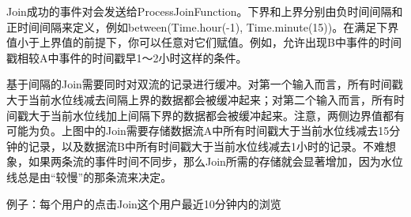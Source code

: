 \documentclass[cn,11pt,chinese]{elegantbook}
\begin{document}
Join成功的事件对会发送给ProcessJoinFunction。下界和上界分别由负时间间隔和正时间间隔来定义，例如between(Time.hour(-1), Time.minute(15))。在满足下界值小于上界值的前提下，你可以任意对它们赋值。例如，允许出现B中事件的时间戳相较A中事件的时间戳早1～2小时这样的条件。

基于间隔的Join需要同时对双流的记录进行缓冲。对第一个输入而言，所有时间戳大于当前水位线减去间隔上界的数据都会被缓冲起来；对第二个输入而言，所有时间戳大于当前水位线加上间隔下界的数据都会被缓冲起来。注意，两侧边界值都有可能为负。上图中的Join需要存储数据流A中所有时间戳大于当前水位线减去15分钟的记录，以及数据流B中所有时间戳大于当前水位线减去1小时的记录。不难想象，如果两条流的事件时间不同步，那么Join所需的存储就会显著增加，因为水位线总是由“较慢”的那条流来决定。

例子：每个用户的点击Join这个用户最近10分钟内的浏览
\end{document}
